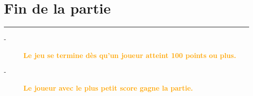 \documentclass{article}%
\begin{document}
%
\sectionfont{\color{orange}}%
\subsectionfont{\color{orange}}%
\subsubsectionfont{\color{orange}}%
\section{ Fin de la partie
}%
\label{sec:Findelapartie}%
\textcolor{orange}{\rule{18cm}{0.07cm}}\break%
\begin{description}%
\item[{-} ]%
%
\textcolor{orange}{%
\textbf{Le jeu se termine dès qu’un joueur atteint 100 points ou plus.}%
}%

%
\item[{-} ]%
%
\textcolor{orange}{%
\textbf{Le joueur avec le plus petit score gagne la partie.}%
}%
\end{description}

%
\end{document}
